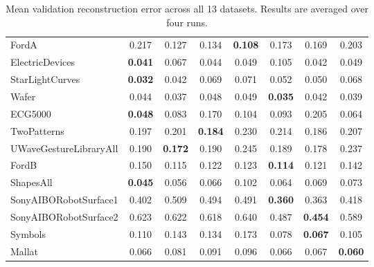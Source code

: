 \documentclass[../../thesis.tex]{subfiles}
\begin{document}
\begin{table}[H]
\begin{adjustbox}{width=\textwidth}
\begin{tabular}{lc|c|c|c|c|c|c}
        \midrule
        FordA                   & 0.217 & 0.127 & 0.134 & \textbf{0.108} & 0.173 & 0.169 & 0.203 \\
        ElectricDevices         & \textbf{0.041} & 0.067 & 0.044 & 0.049 & 0.105 & 0.042 & 0.049 \\
        StarLightCurves         & \textbf{0.032} & 0.042 & 0.069 & 0.071 & 0.052 & 0.050 & 0.068 \\
        Wafer                   & 0.044 & 0.037 & 0.048 & 0.049 & \textbf{0.035} & 0.042 & 0.039 \\
        ECG5000                 & \textbf{0.048} & 0.083 & 0.170 & 0.104 & 0.093 & 0.205 & 0.064 \\
        TwoPatterns             & 0.197 & 0.201 & \textbf{0.184} & 0.230 & 0.214 & 0.186 & 0.207 \\
        UWaveGestureLibraryAll  & 0.190 & \textbf{0.172} & 0.190 & 0.245 & 0.189 & 0.178 & 0.237 \\
        FordB                   & 0.150 & 0.115 & 0.122 & 0.123 & \textbf{0.114} & 0.121 & 0.142 \\
        ShapesAll               & \textbf{0.045} & 0.056 & 0.066 & 0.102 & 0.064 & 0.069 & 0.073 \\
        SonyAIBORobotSurface1   & 0.402 & 0.509 & 0.494 & 0.491 & \textbf{0.360} & 0.363 & 0.418 \\
        SonyAIBORobotSurface2   & 0.623 & 0.622 & 0.618 & 0.640 & 0.487 & \textbf{0.454} & 0.589 \\
        Symbols                 & 0.110 & 0.143 & 0.134 & 0.173 & 0.078 & \textbf{0.067} & 0.105 \\
        Mallat                  & 0.066 & 0.081 & 0.091 & 0.096 & 0.066 & 0.067 & \textbf{0.060} \\
        \bottomrule
    \end{tabular}
    \end{adjustbox}
    \caption{Mean validation reconstruction error across all 13 datasets. Results are averaged over four runs.}
    \label{tab:mean_recons}
\end{table}
\end{document}

